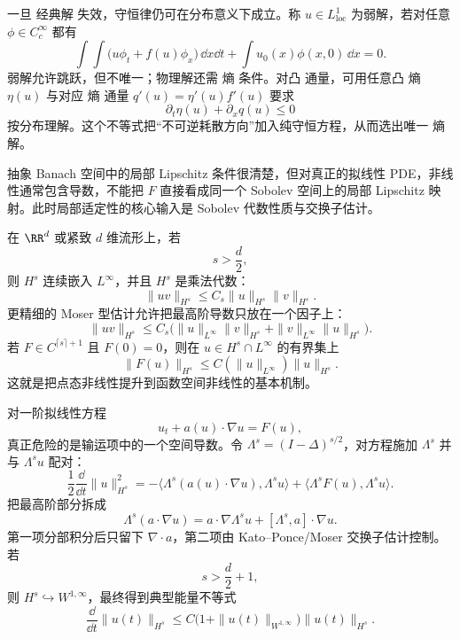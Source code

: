 一旦 经典解 失效，守恒律仍可在分布意义下成立。称 $u\in L^1_{\mathrm{loc}}$ 为弱解，若对任意 $\phi\in C_c^\infty$ 都有
\[
\int\!\!\int
\bigl(u\phi_t+f(u)\phi_x\bigr)\,\dd x\dd t
+
\int u_0(x)\phi(x,0)\,\dd x
=0.
\]
弱解允许跳跃，但不唯一；物理解还需 熵 条件。对凸 通量，可用任意凸 熵 $\eta(u)$ 与对应 熵 通量 $q'(u)=\eta'(u)f'(u)$ 要求
\begin{equation*}\partial_t\eta(u)+\partial_xq(u)\le0\end{equation*}
按分布理解。这个不等式把“不可逆耗散方向”加入纯守恒方程，从而选出唯一 熵解。

抽象 Banach 空间中的局部 Lipschitz 条件很清楚，但对真正的拟线性 PDE，非线性通常包含导数，不能把 $F$ 直接看成同一个 Sobolev 空间上的局部 Lipschitz 映射。此时局部适定性的核心输入是 Sobolev 代数性质与交换子估计。

在 $\RR^d$ 或紧致 $d$ 维流形上，若
\[
s>\frac d2,
\]
则 $H^s$ 连续嵌入 $L^\infty$，并且 $H^s$ 是乘法代数：
\begin{equation*}\boxed{
\|uv\|_{H^s}
\le C_s\|u\|_{H^s}\|v\|_{H^s}
}.\end{equation*}
更精细的 Moser 型估计允许把最高阶导数只放在一个因子上：
\[
\|uv\|_{H^s}
\le C_s\bigl(
\|u\|_{L^\infty}\|v\|_{H^s}
+\|v\|_{L^\infty}\|u\|_{H^s}
\bigr).
\]
若 $F\in C^{\lceil s\rceil+1}$ 且 $F(0)=0$，则在 $u\in H^s\cap L^\infty$ 的有界集上
\[
\|F(u)\|_{H^s}
\le C(\|u\|_{L^\infty})\|u\|_{H^s}.
\]
这就是把点态非线性提升到函数空间非线性的基本机制。

对一阶拟线性方程
\[
u_t+a(u)\cdot\nabla u=F(u),
\]
真正危险的是输运项中的一个空间导数。令 $\Lambda^s=(I-\Delta)^{s/2}$，对方程施加 $\Lambda^s$ 并与 $\Lambda^su$ 配对：
\[
\frac12\frac{\dd}{\dd t}\|u\|_{H^s}^2
=
-\langle \Lambda^s(a(u)\cdot\nabla u),\Lambda^su\rangle
+\langle\Lambda^sF(u),\Lambda^su\rangle.
\]
把最高阶部分拆成
\[
\Lambda^s(a\cdot\nabla u)
=a\cdot\nabla\Lambda^su
+[\Lambda^s,a]\cdot\nabla u.
\]
第一项分部积分后只留下 $\nabla\cdot a$，第二项由 Kato--Ponce/Moser 交换子估计控制。若
\[
s>\frac d2+1,
\]
则 $H^s\hookrightarrow W^{1,\infty}$，最终得到典型能量不等式
\begin{equation}
\boxed{
\frac{\dd}{\dd t}\|u(t)\|_{H^s}
\le
C\bigl(1+\|u(t)\|_{W^{1,\infty}}\bigr)
\|u(t)\|_{H^s}
}.
\label{eq:quasilinear-sobolev-energy}
\end{equation}

